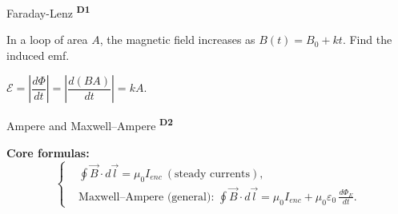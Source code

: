﻿\documentclass[12pt,a4paper]{article}
\providecommand{\KPFormulas}{}
\providecommand{\KPProblems}{}
\newcommand{\DOne}{\texorpdfstring{\textsuperscript{\textbf{D1}}}{ D1}}
\newcommand{\DTwo}{\texorpdfstring{\textsuperscript{\textbf{D2}}}{ D2}}
\begin{document}
\begin{KnowledgePoint}{Faraday-Lenz \DOne}
  \KPProblems
  \begin{cheatproblem}
  In a loop of area $A$, the magnetic field increases as $B(t)=B_0+kt$. Find the induced emf.
  \begin{solutionbox}
  $\mathcal E=\left|\dfrac{d\Phi}{dt}\right|=\left|\dfrac{d(BA)}{dt}\right|=kA$.
  \end{solutionbox}
  \end{cheatproblem}
\end{KnowledgePoint}

\begin{KnowledgePoint}{Ampere and Maxwell--Ampere \DTwo}
  \KPFormulas
  \begin{formulabox}
  \textbf{Core formulas:}
  \[
  \left\{\begin{aligned}
    &\oint \vec B\cdot d\vec l=\mu_0 I_{enc}\ (\text{steady currents}),\\
    &\text{Maxwell--Ampere (general): }\oint \vec B\cdot d\vec l=\mu_0 I_{enc}+\mu_0\varepsilon_0\,\frac{d\Phi_E}{dt}.
  \end{aligned}\right.
  \]
  \end{formulabox}
\end{KnowledgePoint}
\end{document}
